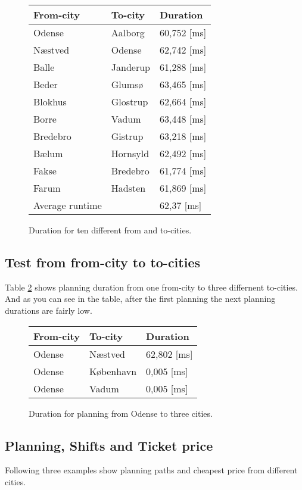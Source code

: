\begin{lslisting}
\begin{figure}[th!]
\centering
\begin{tabular}{l|l|l}
From-city & To-city & Duration \\\hline
Odense & Aalborg & 60,752 [ms] \\
Næstved & Odense & 62,742 [ms] \\
Balle & Janderup & 61,288 [ms] \\
Beder & Glumsø & 63,465 [ms] \\
Blokhus & Glostrup & 62,664 [ms] \\
Borre & Vadum & 63,448 [ms] \\
Bredebro & Gistrup & 63,218 [ms] \\
Bælum & Hornsyld & 62,492 [ms] \\
Fakse & Bredebro & 61,774 [ms] \\
Farum & Hadsten & 61,869 [ms] \\\hline
Average runtime && 62,37 [ms]
\end{tabular}
\captionsetup{type=table}
\caption[tekst i indholdsfortegnelsen]{Duration for ten different from and to-cities.}
\label{tb:fromtoten}
\end{figure}



\subsection{Test from from-city to to-cities}
Table \ref{tb:fromonetocities} shows planning duration from one from-city to three differnent to-cities. And as you can see in the table, after the first planning the next planning durations are fairly low.
\begin{figure}[th!]
\centering
\begin{tabular}{l|l|l}
From-city & To-city & Duration \\\hline
Odense & Næstved & 62,802 [ms] \\
Odense & København & 0,005 [ms] \\
Odense & Vadum & 0,005 [ms]  
\end{tabular}
\captionsetup{type=table}
\caption[tekst i indholdsfortegnelsen]{Duration for planning from Odense to three cities.}
\label{tb:fromonetocities}
\end{figure}


\subsection{Planning, Shifts and Ticket price}
Following three examples show planning paths and cheapest price from different cities.


\end{lslisting}
